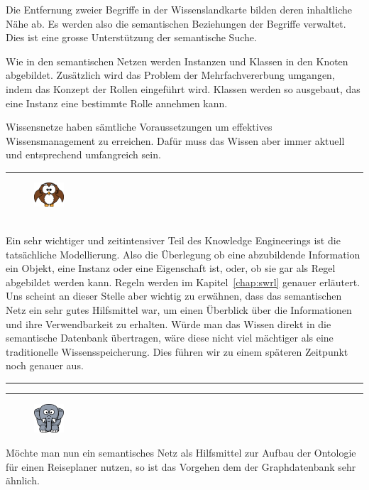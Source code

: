 Die Entfernung zweier Begriffe in der Wissenslandkarte bilden deren inhaltliche Nähe ab. Es werden also die semantischen Beziehungen der Begriffe verwaltet. Dies ist eine grosse Unterstützung der semantische Suche.

Wie in den semantischen Netzen werden Instanzen und Klassen in den Knoten abgebildet. Zusätzlich wird das Problem der Mehrfachvererbung umgangen, indem das Konzept der Rollen eingeführt wird. Klassen werden so ausgebaut, das eine Instanz eine bestimmte Rolle annehmen kann.

Wissensnetze haben sämtliche Voraussetzungen um effektives Wissensmanagement zu erreichen. Dafür muss das Wissen aber immer aktuell und entsprechend umfangreich sein.

\newpage

\noindent\rule[1ex]{\textwidth}{1pt}
\begin{figure}
    \vspace{-2pt}
    \includegraphics[width=0.1\textwidth]{bilder/owl.png}
\end{figure}\\
Ein sehr wichtiger und zeitintensiver Teil des Knowledge Engineerings ist die tatsächliche Modellierung. Also die Überlegung ob eine abzubildende Information ein Objekt, eine Instanz oder eine Eigenschaft ist, oder, ob sie gar als Regel abgebildet werden kann. Regeln werden im Kapitel~\ref{chap:swrl}  genauer erläutert. Uns scheint an dieser Stelle aber wichtig zu erwähnen, dass das semantischen Netz ein sehr gutes Hilfsmittel war, um einen Überblick über die Informationen und ihre Verwendbarkeit zu erhalten. Würde man das Wissen direkt in die semantische Datenbank übertragen, wäre diese nicht viel mächtiger als eine traditionelle Wissensspeicherung. Dies führen wir zu einem späteren Zeitpunkt noch genauer aus.

\noindent\rule[1ex]{\textwidth}{1pt}


\noindent\rule[1ex]{\textwidth}{1pt}
\begin{figure}
    \vspace{-12pt}
    \includegraphics[width=0.1\textwidth]{bilder/elephant.png}
\end{figure}
Möchte man nun ein semantisches Netz als Hilfsmittel zur Aufbau der Ontologie für einen Reiseplaner nutzen, so ist das Vorgehen dem der Graphdatenbank sehr ähnlich. 

